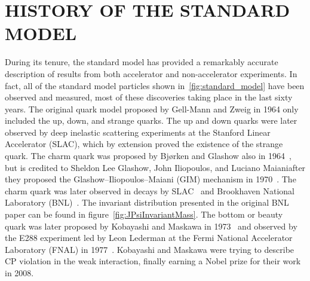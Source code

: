 %
%
%
%



\chapter{\texorpdfstring{\uppercase{History of the Standard Model}}{History of the Standard Model}}
\label{appendix:standard_model_history}

During its tenure, the standard model has provided a remarkably accurate description of results from both accelerator and non-accelerator experiments.
In fact, all of the standard model particles shown in~\ref{fig:standard_model} have been observed and measured, most of these discoveries taking place in the last sixty years.
The original quark model proposed by Gell-Mann and Zweig in 1964 only included the up, down, and strange quarks.
The up and down quarks were later observed by deep inelastic scattering experiments at the Stanford Linear Accelerator (SLAC), which by extension proved the existence of the strange quark.
The charm quark was proposed by Bj{\o}rken and Glashow also in 1964~\cite{BJORKEN1964255}, but is credited to Sheldon Lee Glashow, John Iliopoulos, and Luciano Maianiafter they proposed the Glashow–Iliopoulos–Maiani (GIM) mechanism in 1970~\cite{PhysRevD.2.1285}.
The charm quark was later observed in \JPsi decays by SLAC~\cite{PhysRevLett.33.1406} and Brookhaven National Laboratory (BNL)~\cite{PhysRevLett.33.1404}.
The invariant distribution presented in the original BNL paper can be found in figure~\ref{fig:JPsiInvariantMass}.
The bottom or beauty quark was later proposed by Kobayashi and Maskawa in 1973~\cite{doi:10.1143/PTP.49.652} and observed by the E288 experiment led by Leon Lederman at the Fermi National Accelerator Laboratory (FNAL) in 1977~\cite{PhysRevLett.39.252}.
Kobayashi and Maskawa were trying to describe CP violation in the weak interaction, finally earning a Nobel prize for their work in 2008.

